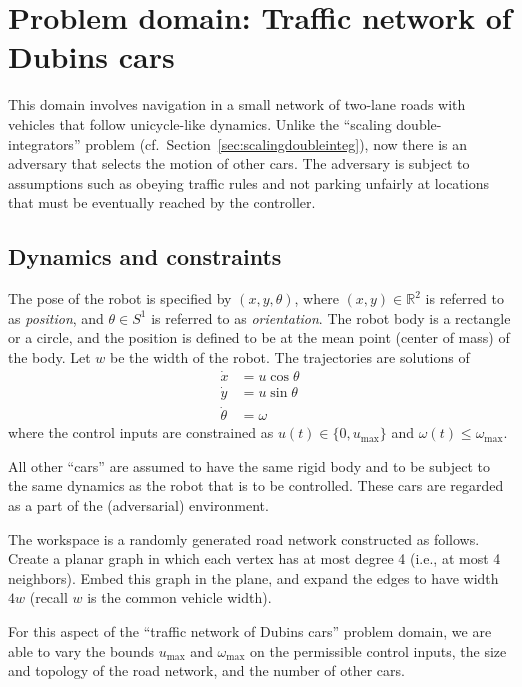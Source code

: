 \documentclass[12pt]{amsart}
\begin{document}
\section{Problem domain: Traffic network of Dubins cars}\label{sec:trafficdubins}

This domain involves navigation in a small network of two-lane roads with
vehicles that follow unicycle-like dynamics.  Unlike the ``scaling
double-integrators'' problem (cf.\ Section~\ref{sec:scalingdoubleinteg}), now
there is an adversary that selects the motion of other cars.  The adversary is
subject to assumptions such as obeying traffic rules and not parking unfairly at
locations that must be eventually reached by the controller.

\subsection{Dynamics and constraints}

The pose of the robot is specified by $(x,y,\theta)$, where $(x,y)\in
\mathbb{R}^2$ is referred to as \textit{position}, and $\theta\in S^1$ is
referred to as \textit{orientation}.  The robot body is a rectangle or a circle,
and the position is defined to be at the mean point (center of mass) of the
body.  Let $w$ be the width of the robot.  The trajectories are solutions of
\begin{align}
\dot{x} &= u \cos \theta \\
\dot{y} &= u \sin \theta \\
\dot{\theta} &= \omega
\end{align}
where the control inputs are constrained as $u(t)\in \{0,u_{\mathrm{max}}\}$ and
$\omega(t) \leq \omega_{\mathrm{max}}$.

All other ``cars'' are assumed to have the same rigid body and to be subject to
the same dynamics as the robot that is to be controlled.  These cars are
regarded as a part of the (adversarial) environment.

The workspace is a randomly generated road network constructed as follows.
Create a planar graph in which each vertex has at most degree 4 (i.e., at most 4
neighbors).  Embed this graph in the plane, and expand the edges to have width
$4w$ (recall $w$ is the common vehicle width).

For this aspect of the ``traffic network of Dubins cars'' problem domain, we are
able to vary the bounds $u_{\mathrm{max}}$ and $\omega_{\mathrm{max}}$ on the
permissible control inputs, the size and topology of the road network, and the
number of other cars.
\end{document}
